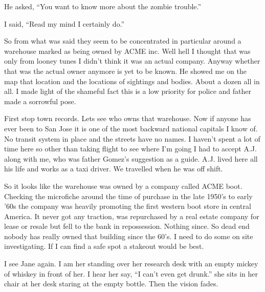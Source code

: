 He asked, ``You want to know more about the zombie trouble.''

I said, ``Read my mind I certainly do.''

So from what was said they seem to be concentrated in particular around a warehouse marked as being owned by ACME inc. Well hell I thought that was only from looney tunes I didn't think it was an actual company. Anyway whether that was the actual owner anymore is yet to be known. He showed me on the map that location and the locations of sightings and bodies. About a dozen all in all. I made light of the shameful fact this is a low priority for police and father made a sorrowful pose.

First stop town records. Lets see who owns that warehouse. Now if anyone has ever been to San Jose it is one of the most backward national capitals I know of. No transit system in place and the streets have no names. I haven't spent a lot of time here so other than taking flight to see where I'm going I had to accept A.J. along with me, who was father Gomez's suggestion as a guide. A.J. lived here all his life and works as a taxi driver. We travelled when he was off shift.

So it looks like the warehouse was owned by a company called ACME boot. Checking the microfiche around the time of purchase in the late 1950's to early '60s the company was heavily promoting the first western boot store in central America. It never got any traction, was repurchased by a real estate company for lease or resale but fell to the bank in repossession. Nothing since. So dead end nobody has really owned that building since the 60's. I need to do some on site investigating. If I can find a safe spot a stakeout would be best.

I see Jane again. I am her standing over her research desk with an empty mickey of whiskey in front of her. I hear her say, ``I can't even get drunk.'' she sits in her chair at her desk staring at the empty bottle. Then the vision fades.

